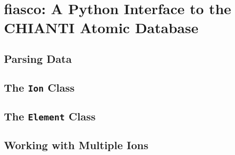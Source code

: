\chapter{fiasco: A Python Interface to the CHIANTI Atomic Database}\label{ap:fiasco}

\section{Parsing Data}

\section{The \texttt{Ion} Class}

\section{The \texttt{Element} Class}

\section{Working with Multiple Ions}\label{sec:ion-collection}
